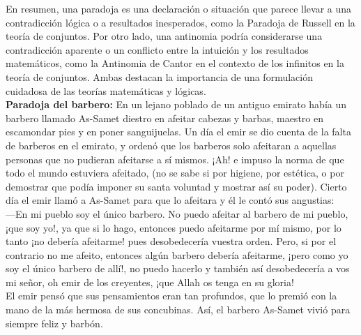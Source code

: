\noindent En resumen, una paradoja es una declaración o situación que parece llevar a una contradicción lógica o a resultados inesperados, como la Paradoja de Russell en la teoría de conjuntos. Por otro lado, una antinomia podría considerarse una contradicción aparente o un conflicto entre la intuición y los resultados matemáticos, como la Antinomia de Cantor en el contexto de los infinitos en la teoría de conjuntos. Ambas destacan la importancia de una formulación cuidadosa de las teorías matemáticas y lógicas. \\

\noindent \textbf{Paradoja del barbero:} En un lejano poblado de un antiguo emirato había un barbero llamado As-Samet diestro en afeitar cabezas y barbas, maestro en escamondar pies y en poner sanguijuelas. Un día el emir se dio cuenta de la falta de barberos en el emirato, y ordenó que los barberos solo afeitaran a aquellas personas que no pudieran afeitarse a sí mismos. ¡Ah! e impuso la norma de que todo el mundo estuviera afeitado, (no se sabe si por higiene, por estética, o por demostrar que podía imponer su santa voluntad y mostrar así su poder). Cierto día el emir llamó a As-Samet para que lo afeitara y él le contó sus angustias:\cite{Paradoja_del_barbero} \\

 \noindent —En mi pueblo soy el único barbero. No puedo afeitar al barbero de mi pueblo, ¡que soy yo!, ya que si lo hago, entonces puedo afeitarme por mí mismo, por lo tanto ¡no debería afeitarme! pues desobedecería vuestra orden. Pero, si por el contrario no me afeito, entonces algún barbero debería afeitarme, ¡pero como yo soy el único barbero de allí!, no puedo hacerlo y también así desobedecería a vos mi señor, oh emir de los creyentes, ¡que Allah os tenga en su gloria!\\

\noindent El emir pensó que sus pensamientos eran tan profundos, que lo premió con la mano de la más hermosa de sus concubinas. Así, el barbero As-Samet vivió para siempre feliz y barbón.
